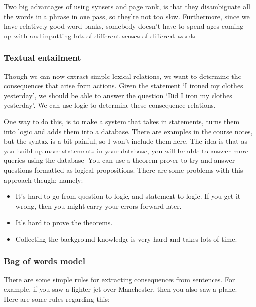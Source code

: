Two big advantages of using synsets and page rank, is that they disambiguate all
the words in a phrase in one pass, so they're not too slow. Furthermore, since
we have relatively good word banks, somebody doesn't have to spend ages coming
up with and inputting lots of different senses of different words.

\subsubsection{Textual entailment}

Though we can now extract simple lexical relations, we want to determine the
consequences that arise from actions. Given the statement `I ironed my clothes
yesterday', we should be able to answer the question `Did I iron my clothes
yesterday'. We can use logic to determine these consequence relations.

One way to do this, is to make a system that takes in statements, turns them
into logic and adds them into a database. There are examples in the course
notes, but the syntax is a bit painful, so I won't include them here. The idea is
that as you build up more statements in your database, you will be able to
answer more queries using the database. You can use a theorem prover to try and
answer questions formatted as logical propositions. There are some problems with
this approach though; namely:

\begin{itemize}
  \item It's hard to go from question to logic, and statement to logic. If you get it 
    wrong, then you might carry your errors forward later.
  \item It's hard to prove the theorems.
  \item Collecting the background knowledge is very hard and takes lots of time.
\end{itemize}

\subsubsection{Bag of words model}

There are some simple rules for extracting consequences from sentences. For
example, if you saw a fighter jet over Manchester, then you also saw a plane.
Here are some rules regarding this:

